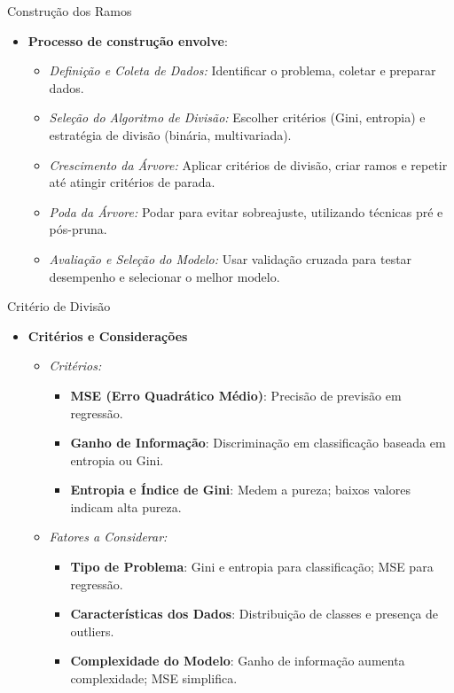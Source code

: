 \documentclass[handout,aspectratio = 169]{beamer}
\begin{document}
\begin{frame}{Construção dos Ramos}
\begin{itemize}
    \item \textbf{Processo de construção envolve}:
    \begin{itemize}
        \item \textit{Definição e Coleta de Dados:} Identificar o problema, coletar e preparar dados.
        \item \textit{Seleção do Algoritmo de Divisão:} Escolher critérios (Gini, entropia) e estratégia de divisão (binária, multivariada).
        \item \textit{Crescimento da Árvore:} Aplicar critérios de divisão, criar ramos e repetir até atingir critérios de parada.
        \item \textit{Poda da Árvore:} Podar para evitar sobreajuste, utilizando técnicas pré e pós-pruna.
        \item \textit{Avaliação e Seleção do Modelo:} Usar validação cruzada para testar desempenho e selecionar o melhor modelo.
    \end{itemize}
\end{itemize}
\end{frame}


\begin{frame}{Critério de Divisão}
\begin{itemize}
    \item \textbf{Critérios e Considerações}
    \begin{itemize}
        \item \textit{Critérios:}
        \begin{itemize}
            \item \textbf{MSE (Erro Quadrático Médio)}: Precisão de previsão em regressão.
            \item \textbf{Ganho de Informação}: Discriminação em classificação baseada em entropia ou Gini.
            \item \textbf{Entropia e Índice de Gini}: Medem a pureza; baixos valores indicam alta pureza.
        \end{itemize}
        \vspace{1em} %
        \item \textit{Fatores a Considerar:}
        \begin{itemize}
            \item \textbf{Tipo de Problema}: Gini e entropia para classificação; MSE para regressão.
            \item \textbf{Características dos Dados}: Distribuição de classes e presença de outliers.
            \item \textbf{Complexidade do Modelo}: Ganho de informação aumenta complexidade; MSE simplifica.
        \end{itemize}
    \end{itemize}
\end{itemize}
\end{frame}
\end{document}
